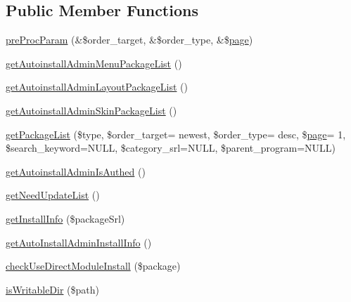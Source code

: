 \subsection*{Public Member Functions}
\begin{DoxyCompactItemize}
\item 
\hyperlink{classautoinstallAdminModel_a614c3051b3e9abff8c17dfc0664d6da5}{pre\+Proc\+Param} (\&\$order\+\_\+target, \&\$order\+\_\+type, \&\$\hyperlink{classpage}{page})
\item 
\hyperlink{classautoinstallAdminModel_a9cb4da298ab863dec8b7664cac2e42a5}{get\+Autoinstall\+Admin\+Menu\+Package\+List} ()
\item 
\hyperlink{classautoinstallAdminModel_a3892c760f1b77e23fdb38a9784cf0ec2}{get\+Autoinstall\+Admin\+Layout\+Package\+List} ()
\item 
\hyperlink{classautoinstallAdminModel_aee0002dcda8a05d57f8f7e5304be087c}{get\+Autoinstall\+Admin\+Skin\+Package\+List} ()
\item 
\hyperlink{classautoinstallAdminModel_a908daae5c3fb3b9c1c58f6ecf9dcd78f}{get\+Package\+List} (\$type, \$order\+\_\+target= \textquotesingle{}newest\textquotesingle{}, \$order\+\_\+type= \textquotesingle{}desc\textquotesingle{}, \$\hyperlink{classpage}{page}= \textquotesingle{}1\textquotesingle{}, \$search\+\_\+keyword=N\+U\+L\+L, \$category\+\_\+srl=N\+U\+L\+L, \$parent\+\_\+program=N\+U\+L\+L)
\item 
\hyperlink{classautoinstallAdminModel_ac0b475b5969fded7a56103ba2e1fa710}{get\+Autoinstall\+Admin\+Is\+Authed} ()
\item 
\hyperlink{classautoinstallAdminModel_a6bba9a390c1274bc3c39a39310781b01}{get\+Need\+Update\+List} ()
\item 
\hyperlink{classautoinstallAdminModel_a8824834dd97b7e69b74af51778d27ed6}{get\+Install\+Info} (\$package\+Srl)
\item 
\hyperlink{classautoinstallAdminModel_ad6d50fbb755d2b48cdbd4269a1d1e404}{get\+Auto\+Install\+Admin\+Install\+Info} ()
\item 
\hyperlink{classautoinstallAdminModel_a899c3f3182e6c80b28f0aabc261bf38c}{check\+Use\+Direct\+Module\+Install} (\$package)
\item 
\hyperlink{classautoinstallAdminModel_ab3314bacf64ba16ea88180124699fc54}{is\+Writable\+Dir} (\$path)
\end{DoxyCompactItemize}
